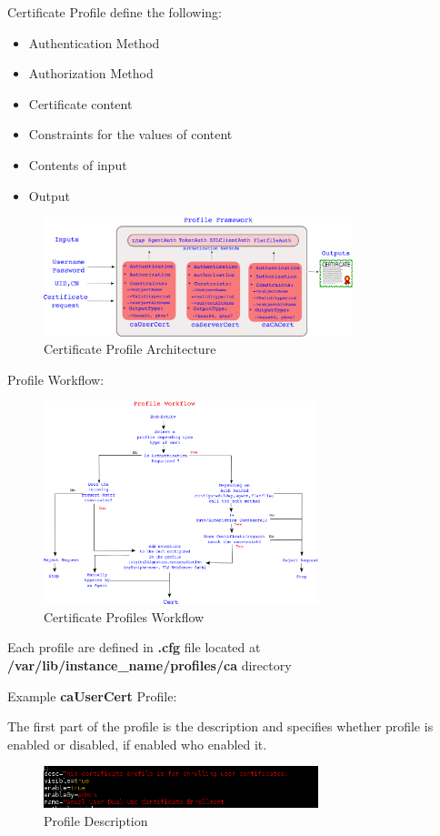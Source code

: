 \documentclass[a4paper]{article}
\begin{document}
\begin{itemize}
            Certificate Profile define the following:
            \begin{itemize}
                \item  Authentication Method
                \item  Authorization Method
                \item  Certificate content
                \item  Constraints for the values of content
                \item  Contents of input
                \item  Output
            \end{itemize}
            \begin{figure}[ht!]
                \centering
                \includegraphics[width=90mm]{CA-profiles-arch.png}
                \caption{Certificate Profile Architecture}
            \end{figure}
            Profile Workflow:
            \begin{figure}[ht!]
                \centering
                \includegraphics[width=80mm]{CA-Profiles-workflow.png}
                \caption{Certificate Profiles Workflow}
            \end{figure}
            
            Each profile are defined in \textbf{.cfg} file located at \textbf{/var/lib/instance\_name/profiles/ca} directory

            Example \textbf{caUserCert} Profile:

            The first part of the profile is the description and specifies whether profile is enabled or disabled, if enabled who
            enabled it. 
            \begin{figure}[ht!]
                \centering
                \includegraphics[width=80mm]{profile-1.png}
                \caption{Profile Description}
            \end{figure}
            

\end{itemize}
\end{document}
